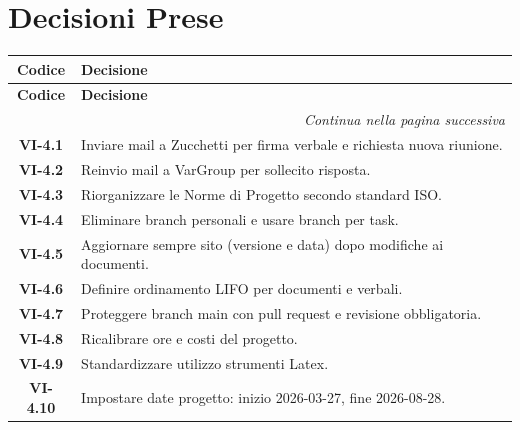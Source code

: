 \section{Decisioni Prese}
\renewcommand{\arraystretch}{1.3}
\vspace{-0.3cm}
\noindent
\begin{longtable}{c p{12cm}}
	\toprule
	\textbf{Codice} & \textbf{Decisione} \\
	\midrule
	\endfirsthead

	\toprule
	\textbf{Codice} & \textbf{Decisione} \\
	\midrule
	\endhead

	\midrule
	\multicolumn{2}{r}{\textit{Continua nella pagina successiva}} \\
	\midrule
	\endfoot

	\bottomrule
	\endlastfoot

	\textbf{VI-4.1} & Inviare mail a Zucchetti per firma verbale e richiesta nuova riunione. \\
	\textbf{VI-4.2} & Reinvio mail a VarGroup per sollecito risposta. \\
	\textbf{VI-4.3} & Riorganizzare le Norme di Progetto secondo standard ISO. \\
	\textbf{VI-4.4} & Eliminare branch personali e usare branch per task. \\
	\textbf{VI-4.5} & Aggiornare sempre sito (versione e data) dopo modifiche ai documenti. \\
	\textbf{VI-4.6} & Definire ordinamento LIFO per documenti e verbali. \\
	\textbf{VI-4.7} & Proteggere branch main con pull request e revisione obbligatoria. \\
	\textbf{VI-4.8} & Ricalibrare ore e costi del progetto. \\
	\textbf{VI-4.9} & Standardizzare utilizzo strumenti Latex. \\
	\textbf{VI-4.10} & Impostare date progetto: inizio 2026-03-27, fine 2026-08-28. \\
\end{longtable}

